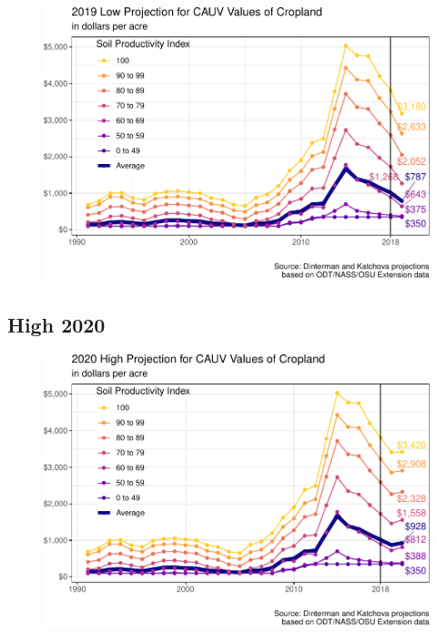 \documentclass[]{article}
\begin{document}
\begin{figure}[H]
\includegraphics[width=1\linewidth]{4-projections-2019-2020_files/figure-latex/low-trend-1} \caption{\label{fig:low-trend}}\label{fig:low-trend}
\end{figure}

\hypertarget{high-2020}{%
\subsection{High 2020}\label{high-2020}}

\begin{figure}[H]
\includegraphics[width=1\linewidth]{4-projections-2019-2020_files/figure-latex/high-trend-2020-1} \caption{\label{fig:high-trend-2020}}\label{fig:high-trend-2020}
\end{figure}
\end{document}
